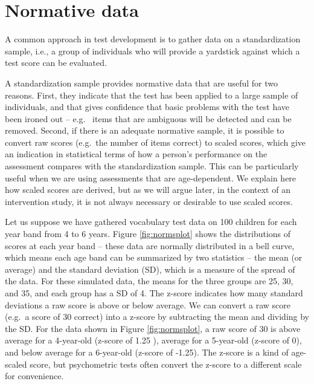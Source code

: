 \documentclass{krantz}
\begin{document}
\hypertarget{normative-data}{%
\section{Normative data}\label{normative-data}}

A common approach in test development is to gather data on a standardization sample, i.e., a group of individuals who will provide a yardstick against which a test score can be evaluated.

A standardization sample provides normative data that are useful for two reasons. First, they indicate that the test has been applied to a large sample of individuals, and that gives confidence that basic problems with the test have been ironed out -- e.g. ~items that are ambiguous will be detected and can be removed. Second, if there is an adequate normative sample, it is possible to convert raw scores (e.g.~the number of items correct) to scaled scores, which give an indication in statistical terms of how a person's performance on the assessment compares with the standardization sample. This can be particularly useful when we are using assessments that are age-dependent. We explain here how scaled scores are derived, but as we will argue later, in the context of an intervention study, it is not always necessary or desirable to use scaled scores.

Let us suppose we have gathered vocabulary test data on 100 children for each year band from 4 to 6 years. Figure \ref{fig:normsplot} shows the distributions of scores at each year band -- these data are normally distributed in a bell curve, which means each age band can be summarized by two statistics -- the mean (or average) and the standard deviation (SD), which is a measure of the spread of the data. For these simulated data, the means for the three groups are 25, 30, and 35, and each group has a SD of 4. The z-score indicates how many standard deviations a raw score is above or below average. We can convert a raw score (e.g.~a score of 30 correct) into a z-score by subtracting the mean and dividing by the SD. For the data shown in Figure \ref{fig:normsplot}, a raw score of 30 is above average for a 4-year-old (z-score of 1.25 ), average for a 5-year-old (z-score of 0), and below average for a 6-year-old (z-score of -1.25). The z-score is a kind of age-scaled score, but psychometric tests often convert the z-score to a different scale for convenience.
\end{document}
